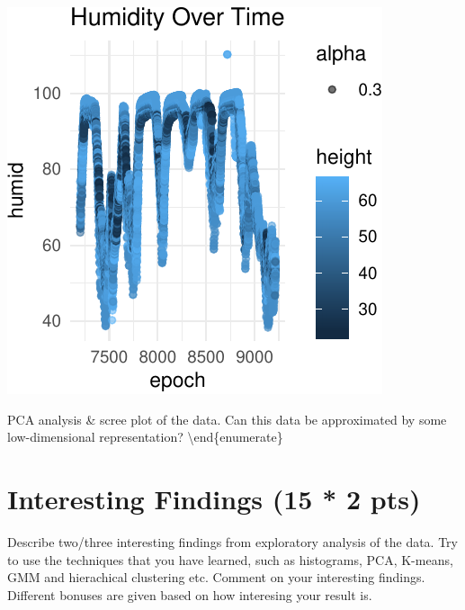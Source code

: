 \documentclass[]{article}
\begin{document}
\begin{center}\includegraphics{Project1WriteUp_files/figure-latex/unnamed-chunk-18-2} \end{center}

PCA analysis \& scree plot of the data. Can this data be approximated by
some low-dimensional representation? \textbackslash{}end\{enumerate\}

\section{Interesting Findings (15 * 2 pts)}

Describe two/three interesting findings from exploratory analysis of the
data. Try to use the techniques that you have learned, such as
histograms, PCA, K-means, GMM and hierachical clustering etc. Comment on
your interesting findings. Different bonuses are given based on how
interesing your result is.
\end{document}
